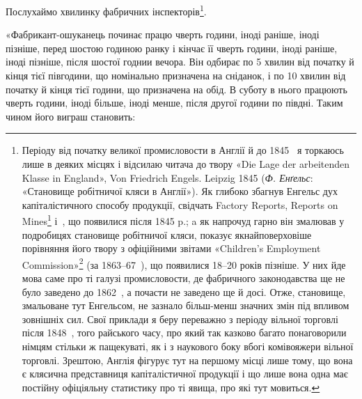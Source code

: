 Послухаймо хвилинку фабричних інспекторів\footnote{
Періоду від початку великої промисловости в Англії й до 1845~
я торкаюсь лише в деяких місцях і відсилаю читача до твору «Die Lage
der arbeitenden Klasse in England», Von Friedrich Engels. Leipzig 1845
(\emph{Ф. Енґельс}: «Становище робітничої кляси в Англії»). Як глибоко збагнув
Енгельс дух капіталістичного способу продукції, свідчать Factory Reports,
Reports on Mines\footnote*{
— звіти фабричних інспекторів, звіти гірничих інспекторів. \emph{Ред.}
} і~, що появилися після 1845 p.; a як напрочуд
гарно він змалював у подробицях становище робітничої кляси,
показує якнайповерховіше порівняння його твору з офіційними звітами
«Children’s Employment Commission»\footnote*{
— комісії для вивчення праці дітей. \emph{Ред.}
} (за 1863--67~), що появилися
18--20 років пізніше. У них йде мова саме про ті галузі промисловости,
де фабричного законодавства ще не було заведено до 1862~, а почасти не
заведено ще й досі. Отже, становище, змальоване тут Енгельсом, не зазнало
більш-менш значних змін під впливом зовнішніх сил. Свої приклади
я беру переважно з періоду вільної торговлі після 1848~, того райського
часу, про який так казково багато понаговорили німцям стільки ж пащекуваті,
як і з наукового боку вбогі комівояжери вільної торговлі. Зрештою, Англія фігурує тут на першому
місці лише тому, що вона є клясична
представниця капіталістичної продукції і що лише вона одна має
постійну офіціяльну статистику про ті явища, про які тут мовиться.
}.

«Фабрикант-ошуканець починає працю чверть години, іноді
раніше, іноді пізніше, перед шостою годиною ранку і кінчає її
чверть години, іноді раніше, іноді пізніше, після шостої годнии
вечора. Він одбирає по 5 хвилин від початку й кінця тієї півгодини,
що номінально призначена на сніданок, і по 10 хвилин від
початку й кінця тієї години, що призначена на обід. В суботу в
нього працюють чверть години, іноді більше, іноді менше, після
другої години по півдні. Таким чином його виграш становить:

